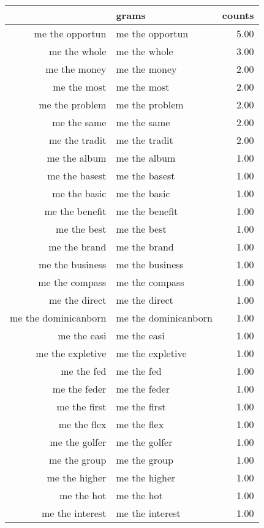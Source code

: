 \begin{table}[ht]
\centering
\begin{tabular}{rlr}
  \hline
 & grams & counts \\ 
  \hline
me the opportun & me the opportun & 5.00 \\ 
  me the whole & me the whole & 3.00 \\ 
  me the money & me the money & 2.00 \\ 
  me the most & me the most & 2.00 \\ 
  me the problem & me the problem & 2.00 \\ 
  me the same & me the same & 2.00 \\ 
  me the tradit & me the tradit & 2.00 \\ 
  me the album & me the album & 1.00 \\ 
  me the basest & me the basest & 1.00 \\ 
  me the basic & me the basic & 1.00 \\ 
  me the benefit & me the benefit & 1.00 \\ 
  me the best & me the best & 1.00 \\ 
  me the brand & me the brand & 1.00 \\ 
  me the business & me the business & 1.00 \\ 
  me the compass & me the compass & 1.00 \\ 
  me the direct & me the direct & 1.00 \\ 
  me the dominicanborn & me the dominicanborn & 1.00 \\ 
  me the easi & me the easi & 1.00 \\ 
  me the expletive & me the expletive & 1.00 \\ 
  me the fed & me the fed & 1.00 \\ 
  me the feder & me the feder & 1.00 \\ 
  me the first & me the first & 1.00 \\ 
  me the flex & me the flex & 1.00 \\ 
  me the golfer & me the golfer & 1.00 \\ 
  me the group & me the group & 1.00 \\ 
  me the higher & me the higher & 1.00 \\ 
  me the hot & me the hot & 1.00 \\ 
  me the interest & me the interest & 1.00 \\ 

\end{tabular}
\end{table}
